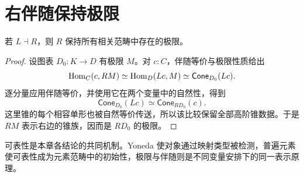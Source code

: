 \section{右伴随保持极限}
\begin{theorem}
若 $L\dashv R$，则 $R$ 保持所有相关范畴中存在的极限。
\end{theorem}
\begin{proof}
设图表 $D_0:K\to D$ 有极限 $M$。对 $c:C$，伴随等价与极限性质给出
\[
\operatorname{Hom}_C(c,RM)
\simeq\operatorname{Hom}_D(Lc,M)
\simeq\mathsf{Cone}_{D_0}(Lc).
\]
逐分量应用伴随等价，并使用它在两个变量中的自然性，得到
\[
\mathsf{Cone}_{D_0}(Lc)
\simeq\mathsf{Cone}_{R D_0}(c).
\]
这里锥的每个相容单形也被自然等价传送，所以该比较保留全部高阶锥数据。于是 $RM$ 表示右边的锥族，因而是 $R D_0$ 的极限。
\end{proof}
\begin{remark}
可表性是本章各结论的共同机制。Yoneda 使对象通过映射类型被检测，普遍元素使可表性成为元素范畴中的初始性，极限与伴随则是不同变量安排下的同一表示原理。
\end{remark}
